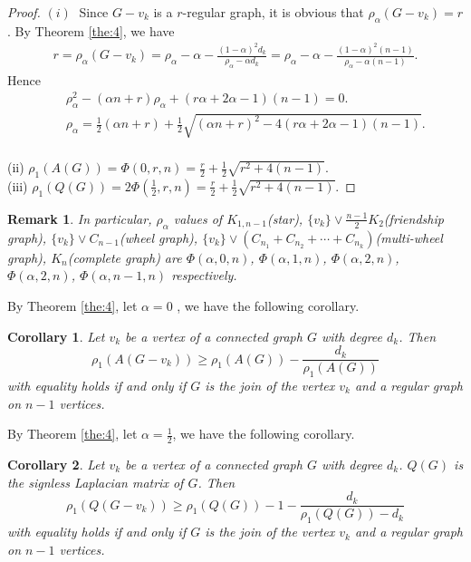 \documentclass[amsthm]{elsart}
\newtheorem{corollary}{Corollary}[section]
\newtheorem{remark}{Remark}[section]
\begin{document}
\begin{proof}
$(i) \; $ Since $G - v_k$ is a $r$-regular graph, it is obvious that $\rho _\alpha (G - v_k) = r$.
By Theorem \ref{the:4}, we have
\begin{eqnarray*}
r = \rho _\alpha (G - v_k)
  = \rho _\alpha - \alpha - \frac{(1 - \alpha)^2 d_k}{\rho _\alpha - \alpha d_k}
  = \rho _\alpha - \alpha - \frac{(1 - \alpha)^2 (n - 1)}{\rho _\alpha - \alpha (n - 1)}.
\end{eqnarray*}
Hence
\begin{eqnarray*}
&& \rho _\alpha ^2 - (\alpha n + r) \rho _\alpha + (r \alpha + 2 \alpha - 1) ( n - 1) = 0.
\\ && \rho _\alpha = \frac{1}{2}(\alpha n + r) + \frac{1}{2} \sqrt{(\alpha n + r)^2 - 4 (r \alpha + 2 \alpha - 1) ( n - 1) }.
\end{eqnarray*}
\\ (ii) \; $\rho _1(A(G)) = \Phi(0, r, n) = \frac{r}{2} + \frac{1}{2} \sqrt{r ^2 + 4 ( n - 1) } .$
\\ (iii) \; $\rho _1(Q(G)) = 2 \Phi(\frac{1}{2}, r, n) = \frac{r}{2} + \frac{1}{2} \sqrt{r ^2 + 4 ( n - 1) } $.
\end{proof}

\begin{remark}
In particular, $\rho _\alpha$ values of $K_{1,n-1}$(star), $\{v_k\} \vee \frac{n-1}{2} K_2$(friendship graph), $\{v_k\} \vee C_{n-1}$(wheel graph), $\{v_k\} \vee (C_{n_1} + C_{n_2} + \cdots + C_{n_k})  $(multi-wheel graph), $K_n$(complete graph) are $\Phi(\alpha, 0, n)$, $\Phi(\alpha, 1, n)$, $\Phi(\alpha, 2, n)$, $\Phi(\alpha, 2, n)$, $\Phi(\alpha, n-1, n)$ respectively.
\end{remark}

By Theorem \ref{the:4}, let $\alpha = 0$ , we have the following corollary.
\begin{corollary} \label{coro:4}
Let $v_k$ be a vertex of a connected graph $G$ with degree $d_k$.  Then
\begin{equation} \label{equ:coro4}
\rho _1 (A(G - v_k))
  \geqslant \rho _1(A(G)) - \frac{d_k}{\rho _1(A(G))}
\end{equation}
with equality holds if and only if $G$ is the join of the vertex $v_k$ and a regular graph on $n-1$ vertices.
\end{corollary}

By Theorem \ref{the:4}, let $\alpha = \frac{1}{2}$, we have the following corollary.
\begin{corollary} \label{coro:5}
Let $v_k$ be a vertex of a connected graph $G$ with degree $d_k$. $Q(G)$  is the signless Laplacian matrix of $G$. Then
\begin{equation} \label{equ:coro5}
\rho _1 (Q(G - v_k))
  \geqslant \rho _1(Q(G)) - 1 - \frac{d_k}{\rho _1(Q(G)) - d_k}
\end{equation}
with equality holds if and only if $G$ is the join of the vertex $v_k$ and a regular graph on $n-1$ vertices.
\end{corollary}
\end{document}
